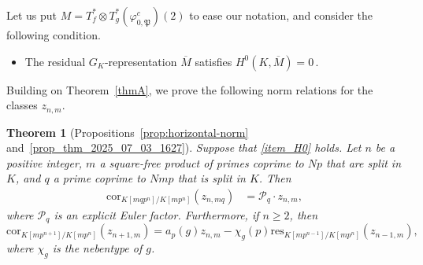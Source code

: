 \documentclass{amsart}
\makeatletter
\numberwithin{equation}{section}
\newcommand{\mylabel}[2]{#2\def\@currentlabel{#2}\label{#1}}
\newtheorem{lthm}{Theorem}
\newcommand{\frk}{\mathfrak}
\newcommand{\cP}{\mathcal{P}}
\makeatother
\begin{document}
\subsubsection{} Let us put $M=T_f^\ast\otimes T_g^\ast(\varphi_{0,\frk{P}}^c)(2)$ to ease our notation, and consider the following condition. 
\begin{itemize}
    \item[(\mylabel{item_H0}{\textbf{H}$^0$})] The residual $G_{K}$-representation $ \overline{M}$ satisfies $H^0(K,\overline{M})=0$\,.
\end{itemize}
Building on Theorem~\ref{thmA}, we prove the following norm relations for the classes $z_{n,m}$.
\begin{lthm}[Propositions~\ref{prop:horizontal-norm} and~\ref{prop_thm_2025_07_03_1627}]\label{thmB}
Suppose that \eqref{item_H0}  holds. Let $n$ be a positive integer, $m$ a square-free product of primes coprime to $Np$ that are split in $K$, and $q$ a prime coprime to $Nmp$ that is split in $K$. Then
    \begin{align*}
        \mathrm{cor}_{K[mqp^n]/K[mp^n]}(z_{n,mq}) &= \cP_q\cdot z_{n,m},
    \end{align*}
    where $\cP_q$ is an explicit Euler factor.
Furthermore, if $n\geq 2$, then
    \[
    \mathrm{cor}_{K[mp^{n+1}]/K[mp^n]}(z_{n+1,m})=a_p(g)z_{n,m}-\chi_g(p)\mathrm{res}_{K[mp^{n-1}]/K[mp^n]}(z_{n-1,m}),
    \]
    where $\chi_g$ is the nebentype of $g$.
\end{lthm}
\end{document}
